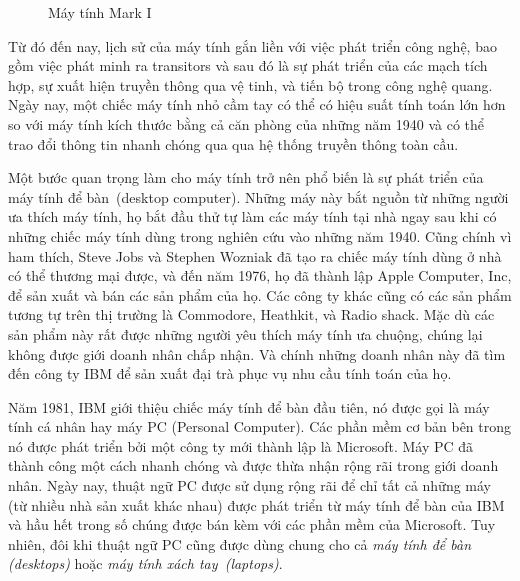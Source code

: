 \begin{figure}[tb]
\centering
\caption{Máy tính Mark I}
  \label{fig:fig0.4}
\end{figure}


Từ đó đến nay, lịch sử của máy tính gắn liền với việc phát triển công nghệ, bao gồm việc
phát minh ra transitors và sau đó là sự phát triển của các mạch tích hợp, sự xuất hiện
truyền thông qua vệ tinh, và tiến bộ trong công nghệ quang. Ngày nay, một chiếc máy tính
nhỏ cầm tay có thể có hiệu suất tính toán lớn hơn so với máy tính kích thước bằng cả căn
phòng của những năm 1940 và có thể trao đổi thông tin nhanh chóng qua qua hệ thống truyền
thông toàn cầu.

Một bước quan trọng làm cho máy tính trở nên phổ biến là sự phát triển của máy tính để
bàn~(desktop computer).  Những máy này bắt nguồn từ những người ưa thích máy tính, họ bắt
đầu thử tự làm các máy tính tại nhà ngay sau khi có những chiếc máy tính dùng trong nghiên
cứu vào những năm 1940. Cũng chính vì ham thích, Steve Jobs và Stephen Wozniak đã tạo ra
chiếc máy tính dùng ở nhà có thể thương mại được, và đến năm 1976, họ đã thành lập Apple
Computer, Inc, để sản xuất và bán các sản phẩm của họ. Các công ty khác cũng có các sản
phẩm tương tự trên thị trường là Commodore, Heathkit, và Radio shack. Mặc dù các sản phẩm
này rất được những người yêu thích máy tính ưa chuộng, chúng lại không được giới doanh
nhân chấp nhận. Và chính những doanh nhân này đã tìm đến công ty IBM để sản xuất đại trà
phục vụ nhu cầu tính toán của họ.

Năm 1981, IBM giới thiệu chiếc máy tính để bàn đầu tiên, nó được gọi là máy tính cá nhân
hay máy PC (Personal Computer). Các phần mềm cơ bản bên trong nó được phát triển bởi một
công ty mới thành lập là Microsoft. Máy PC đã thành công một cách nhanh chóng và được thừa
nhận rộng rãi trong giới doanh nhân. Ngày nay, thuật ngữ PC được sử dụng rộng rãi để chỉ
tất cả những máy (từ nhiều nhà sản xuất khác nhau) được phát triển từ máy tính để bàn của
IBM và hầu hết trong số chúng được bán kèm với các phần mềm của Microsoft. Tuy nhiên, đôi
khi thuật ngữ PC cũng được dùng chung cho cả \textit{máy tính để bàn (desktops)} hoặc
\textit{máy tính xách tay~(laptops)}.


